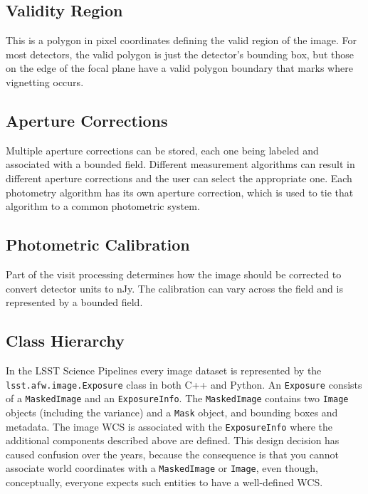 \subsection{Validity Region}

This is a polygon in pixel coordinates defining the valid region of the image.
For most detectors, the valid polygon is just the detector's bounding box, but those on the edge of the focal plane have a valid polygon boundary that marks where vignetting occurs.

\subsection{Aperture Corrections}

Multiple aperture corrections can be stored, each one being labeled and associated with a bounded field.
Different measurement algorithms can result in different aperture corrections and the user can select the appropriate one.
Each photometry algorithm has its own aperture correction, which is used to tie that algorithm to a common photometric system.

\subsection{Photometric Calibration}

Part of the visit processing determines how the image should be corrected to convert detector units to nJy.
The calibration can vary across the field and is represented by a bounded field.

\subsection{Class Hierarchy}

In the LSST Science Pipelines every image dataset is represented by the \texttt{lsst.afw.image.Exposure} class in both C++ and Python.
An \texttt{Exposure} consists of a \texttt{MaskedImage} and an \texttt{ExposureInfo}.
The \texttt{MaskedImage} contains two \texttt{Image} objects (including the variance) and a \texttt{Mask} object, and bounding boxes and metadata.
The image WCS is associated with the \texttt{ExposureInfo} where the additional components described above are defined.
This design decision has caused confusion over the years, because the consequence is that you cannot associate world coordinates with a \texttt{MaskedImage} or \texttt{Image}, even though, conceptually, everyone expects such entities to have a well-defined WCS.


